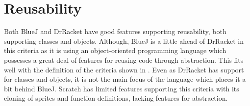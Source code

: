 \section{Reusability}
\label{sec:reusability}
Both BlueJ and DrRacket have good features supporting reusability, both supporting classes and objects. Although, BlueJ is a little ahead of DrRacket in this criteria as it is using an object-oriented programming language which possesses a great deal of features for reusing code through abstraction. This fits well with the definition of the criteria shown in . Even as DrRacket has support for classes and objects, it is not the main focus of the language which places it a bit behind BlueJ. Scratch has limited features supporting this criteria with its cloning of sprites and function definitions, lacking features for abstraction.